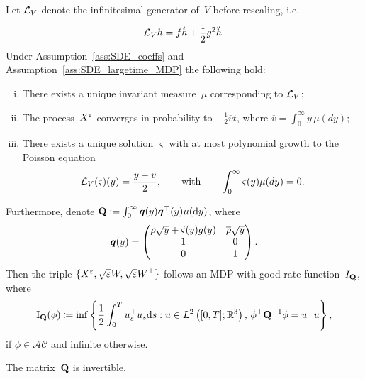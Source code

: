\begin{theorem}\label{thm:limitPoisson}
Let $\mathcal{L}_{V}$ denote the infinitesimal generator of~$V$ before rescaling, i.e.
\[
\mathcal{L}_V h = f\dot{h} + \frac{1}{2}g^2\ddot{h}.
\]
Under Assumption~\ref{ass:SDE_coeffs} and Assumption~\ref{ass:SDE_largetime_MDP} the following hold:
\begin{enumerate}[i)]
    \item There exists a unique invariant measure~$\mu$ corresponding to $\mathcal{L}_V$;
    \item The process~$X^{\varepsilon}$ converges in probability to $-\frac{1}{2}\overline{v}t$, where $\overline{v} = \int_0^\infty y \, \mu(dy)$;
    \item There exists a unique solution $\varsigma$ with at most polynomial growth to the Poisson equation
    \[
    \mathcal{L}_V(\varsigma)(y) = \frac{y - \bar{v}}{2}, 
    \qquad \text{with} \qquad \int_0^\infty \varsigma(y)\mu(dy)=0.
    \]
\end{enumerate}
Furthermore, denote 
$\boldsymbol{\mathrm{Q}}:=\int_0^\infty\boldsymbol{q}(y)\boldsymbol{q}^\top(y)\mu(\mathrm{d} y)$, where
$$
\boldsymbol{q}(y) =
\begin{pmatrix}
\rho\sqrt{y} + \dot{\varsigma}(y)g(y) & \overline{\rho}\sqrt{y}\\
1 & 0 \\
0 & 1 \\
\end{pmatrix}.
$$
Then the triple $\{X^{\varepsilon},\sqrt{\varepsilon}W,\sqrt{\varepsilon}W^{\perp}\}$ follows an MDP with good rate function~$I_{\boldsymbol{\mathrm{Q}}}$,
where
$$
\mathrm{I}_{\boldsymbol{\mathrm{Q}}}(\phi) \coloneqq 
\inf \left\{\frac{1}{2}\int_0^T u_s^\top u_s\mathrm{d} s: u\in L^2\left([0,T]; \mathbb{R}^3\right), \, \dot{\phi}^\top \boldsymbol{\mathrm{Q}}^{-1} \dot{\phi} = u^\top u \right\},
$$
if $\phi\in\mathcal{AC}$ and infinite otherwise.
\end{theorem}
\begin{lemma}\label{q-invertible}
The matrix~$\boldsymbol{\mathrm{Q}}$ is invertible. 
\end{lemma}
